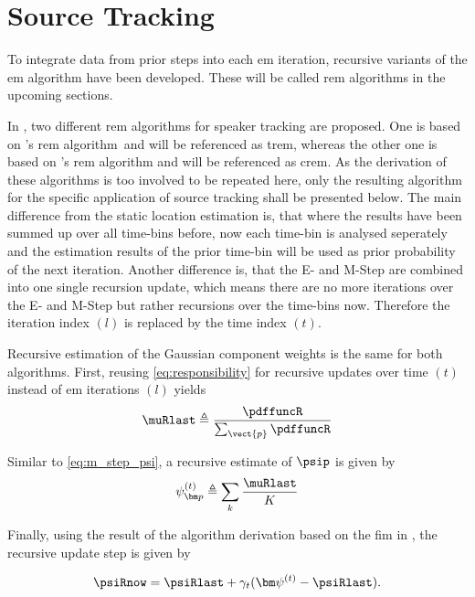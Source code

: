\section{Source Tracking}
\label{sec:algSrcTrack}

To integrate data from prior steps into each \gls{em} iteration, recursive variants of the \gls{em} algorithm have been developed. These will be called \gls{rem} algorithms in the upcoming sections.

In \cite{Schwartz2014}, two different \gls{rem} algorithms for speaker tracking are proposed. One is based on \citeauthor{Titterington1984}'s \gls{rem} algorithm\ and will be referenced as \acrshort{trem}, whereas the other one is based on \citeauthor{Cappe2009}'s \gls{rem} algorithm and will be referenced as \acrshort{crem}.
As the derivation of these algorithms is too involved to be repeated here, only the resulting algorithm for the specific application of source tracking shall be presented below.
The main difference from the static location estimation is, that where the results have been summed up over all time-bins before, now each time-bin is analysed seperately and the estimation results of the prior time-bin will be used as prior probability of the next iteration. Another difference is, that the E- and M-Step are combined into one single recursion update, which means there are no more iterations over the E- and M-Step but rather recursions over the time-bins now. Therefore the iteration index $(l)$ is replaced by the time index $(t)$.


Recursive estimation of the Gaussian component weights is the same for both algorithms. First, reusing \eqref{eq:responsibility} for recursive updates over time $(t)$ instead of \gls{em} iterations $(l)$ yields
\begin{equation}
    \muRlast \triangleq \frac{\pdffuncR}{\sum_{\vect{p}}\pdffuncR}
\end{equation}

Similar to \eqref{eq:m_step_psi}, a recursive estimate of $\psip$ is given by
\begin{equation}
    \psi_{\bm p}^{(t)}\triangleq\sum_k \frac{\muRlast}{K}
\end{equation}

Finally, using the result of the algorithm derivation based on the \gls{fim} in \cite{Schwartz2014}, the recursive update step is given by

\begin{equation}
\label{eq:crem-psi}
    \psiRnow = \psiRlast +\gamma_t(\bm\psi^{(t)} -\psiRlast ).
\end{equation}
\renewcommand{\*}{\cdot}

